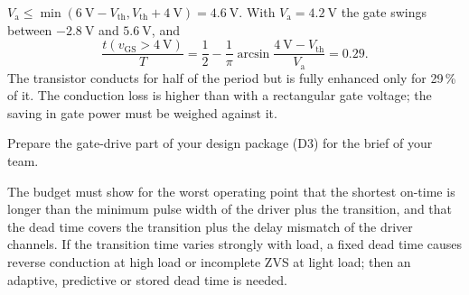 \begin{solutionblock}
	$V_\mathrm{a}\leq\min(\SI{6}{\volt}-V_\mathrm{th},V_\mathrm{th}+\SI{4}{\volt})=\SI{4.6}{\volt}$. With $V_\mathrm{a}=\SI{4.2}{\volt}$ the gate swings between $\SI{-2.8}{\volt}$ and $\SI{5.6}{\volt}$, and
	\begin{equation}
		\frac{t(v_\mathrm{GS}>\SI{4}{\volt})}{T}=\frac12-\frac1\pi\arcsin\frac{\SI{4}{\volt}-V_\mathrm{th}}{V_\mathrm{a}}=0.29.
	\end{equation}
	The transistor conducts for half of the period but is fully enhanced only for 29\,\% of it. The conduction loss is higher than with a rectangular gate voltage; the saving in gate power must be weighed against it.
\end{solutionblock}



Prepare the gate-drive part of your design package (D3) for the brief of your team.


\begin{solutionblock}
	The budget must show for the worst operating point that the shortest on-time is longer than the minimum pulse width of the driver plus the transition, and that the dead time covers the transition plus the delay mismatch of the driver channels. If the transition time varies strongly with load, a fixed dead time causes reverse conduction at high load or incomplete ZVS at light load; then an adaptive, predictive or stored dead time is needed.
\end{solutionblock}


